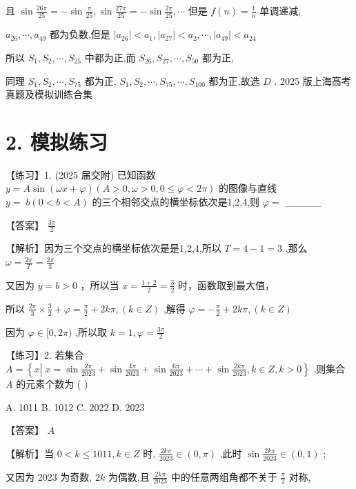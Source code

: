 \documentclass[10pt]{article}
\begin{document}
且 \(\sin \frac{26\pi }{25} =  - \sin \frac{\pi }{25},\sin \frac{27\pi }{25} =  - \sin \frac{2\pi }{25},\cdots\) 但是 \(f\left( n\right)  = \frac{1}{n}\) 单调递减,

\({a}_{26},\cdots ,{a}_{49}\) 都为负数,但是 \(\left| {a}_{26}\right|  < {a}_{1},\left| {a}_{27}\right|  < {a}_{2},\cdots ,\left| {a}_{49}\right|  < {a}_{24}\)

所以 \({S}_{1},{S}_{2},\cdots ,{S}_{25}\) 中都为正,而 \({S}_{26},{S}_{27},\cdots ,{S}_{50}\) 都为正,

同理 \({S}_{1},{S}_{2},\cdots ,{S}_{75}\) 都为正, \({S}_{1},{S}_{2},\cdots ,{S}_{75},\cdots ,{S}_{100}\) 都为正,故选 \(D\) . 2025 版上海高考真题及模拟训练合集

\section*{2. 模拟练习}

【练习】1. (2025 届交附) 已知函数 \(y = A\sin \left( {{\omega x} + \varphi }\right) \left( {A > 0,\omega  > 0,0 \leq  \varphi  < {2\pi }}\right)\) 的图像与直线 \(y = \; b\left( {0 < b < A}\right)\) 的三个相邻交点的横坐标依次是1,2,4,则 \(\varphi  =\) \_\_\_\_\_

【答案】 \(\frac{3\pi }{2}\)

【解析】因为三个交点的横坐标依次是是1,2,4,所以 \(T = 4 - 1 = 3\) ,那么 \(\omega  = \frac{2\pi }{T} = \frac{2\pi }{3}\)

又因为 \(y = b > 0\) ，所以当 \(x = \frac{1 + 2}{2} = \frac{3}{2}\) 时，函数取到最大值，

所以 \(\frac{2\pi }{3} \times  \frac{3}{2} + \varphi  = \frac{\pi }{2} + {2k\pi },\left( {k \in  Z}\right)\) ,解得 \(\varphi  =  - \frac{\pi }{2} + {2k\pi },\left( {k \in  Z}\right)\)

因为 \(\varphi  \in  \lbrack 0,{2\pi })\) ,所以取 \(k = 1,\varphi  = \frac{3\pi }{2}\)

【练习】2. 若集合 \(A = \left\{  {x\left| {\;x = \sin \frac{2\pi }{2023} + \sin \frac{4\pi }{2023} + \sin \frac{6\pi }{2023} + \cdots  + \sin \frac{2k\pi }{2023}}\right. ,k \in  Z,k > 0}\right\}\) ,则集合 \(A\) 的元素个数为 ( )

A. 1011 B. 1012 C. 2022 D. 2023

【答案】 \(A\)

【解析】当 \(0 < k \leq  {1011},k \in  Z\) 时, \(\frac{2k\pi }{2023} \in  \left( {0,\pi }\right)\) ,此时 \(\sin \frac{2k\pi }{2023} \in  \left( {0,1}\right)\) ;

又因为 2023 为奇数, \({2k}\) 为偶数,且 \(\frac{2k\pi }{2023}\) 中的任意两组角都不关于 \(\frac{\pi }{2}\) 对称,
\end{document}
